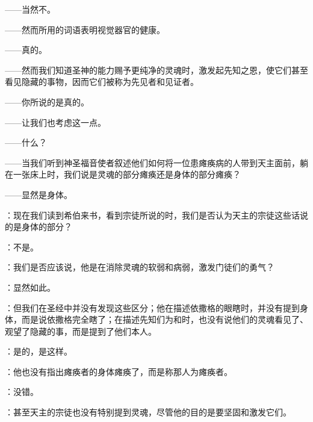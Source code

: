 ——当然不。\par

——然而所用的词语表明视觉器官的健康。\par

——真的。\par

——然而我们知道圣神的能力赐予更纯净的灵魂时，激发起先知之恩，使它们甚至看见隐藏的事物，因而它们被称为先见者和见证者。\par

——你所说的是真的。\par

——让我们也考虑这一点。\par

——什么？\par

——当我们听到神圣福音使者叙述他们如何将一位患瘫痪病的人带到天主面前，躺在一张床上时，我们说是灵魂的部分瘫痪还是身体的部分瘫痪？\par

——显然是身体。\par

：现在我们读到希伯来书，看到宗徒所说的时，我们是否认为天主的宗徒这些话说的是身体的部分？\par

：不是。\par

：我们是否应该说，他是在消除灵魂的软弱和病弱，激发门徒们的勇气？\par

：显然如此。\par

：但我们在圣经中并没有发现这些区分；他在描述依撒格的眼瞎时，并没有提到身体，而是说依撒格完全瞎了；在描述先知们为和时，也没有说他们的灵魂看见了、观望了隐藏的事，而是提到了他们本人。\par

：是的，是这样。\par

：他也没有指出瘫痪者的身体瘫痪了，而是称那人为瘫痪者。\par

：没错。\par

：甚至天主的宗徒也没有特别提到灵魂，尽管他的目的是要坚固和激发它们。\par

